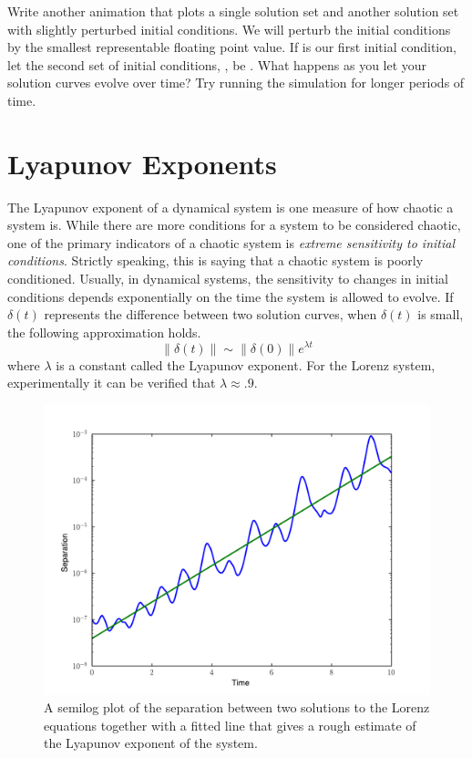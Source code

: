 \begin{problem}
Write another animation that plots a single solution set and another solution set with slightly perturbed initial conditions.
We will perturb the initial conditions by the smallest representable floating point value.
If  is our first initial condition, let the second set of initial conditions, , be .
What happens as you let your solution curves evolve over time?
Try running the simulation for longer periods of time.
\end{problem}

\section*{Lyapunov Exponents}
The Lyapunov exponent of a dynamical system is one measure of how chaotic a system is.
While there are more conditions for a system to be considered chaotic, one of the primary indicators of a chaotic system is \emph{extreme sensitivity to initial conditions}.
Strictly speaking, this is saying that a chaotic system is poorly conditioned.
Usually, in dynamical systems, the sensitivity to changes in initial conditions depends exponentially on the time the system is allowed to evolve.
If $\delta(t)$ represents the difference between two solution curves, when $\delta(t)$ is small, the following approximation holds.
\[\|\delta(t)\| \sim \|\delta(0)\| e^{\lambda t}\]
where $\lambda$ is a constant called the Lyapunov exponent.
For the Lorenz system, experimentally it can be verified that $\lambda \approx .9$.

\begin{figure}
\includegraphics[width=\textwidth]{lyapunov_plot.pdf}
\caption{A semilog plot of the separation between two solutions to the Lorenz equations together with a fitted line that gives a rough estimate of the Lyapunov exponent of the system.}
\label{fig:lyapunov_exponent}
\end{figure}

